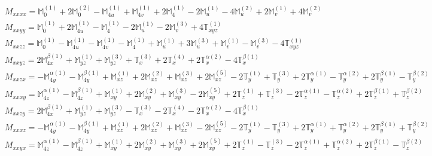 \documentclass[fleqn,8pt,landscape]{jsarticle}
\begin{document}
\begin{align*}
& M_{xxxx} = \mathbb{M}_{0}^{(1)} + 2 \mathbb{M}_{0}^{(2)} - \mathbb{M}_{4u}^{(1)} + \mathbb{M}_{4v}^{(1)} + 2 \mathbb{M}_{4}^{(1)} - 2 \mathbb{M}_{u}^{(1)} - 4 \mathbb{M}_{u}^{(2)} + 2 \mathbb{M}_{v}^{(1)} + 4 \mathbb{M}_{v}^{(2)} \\
& M_{xxyy} = \mathbb{M}_{0}^{(1)} + 2 \mathbb{M}_{4u}^{(1)} - \mathbb{M}_{4}^{(1)} - 2 \mathbb{M}_{u}^{(1)} - 2 \mathbb{M}_{v}^{(3)} + 4 \mathbb{T}_{xyz}^{(1)} \\
& M_{xxzz} = \mathbb{M}_{0}^{(1)} - \mathbb{M}_{4u}^{(1)} - \mathbb{M}_{4v}^{(1)} - \mathbb{M}_{4}^{(1)} + \mathbb{M}_{u}^{(1)} + 3 \mathbb{M}_{u}^{(3)} + \mathbb{M}_{v}^{(1)} - \mathbb{M}_{v}^{(3)} - 4 \mathbb{T}_{xyz}^{(1)} \\
& M_{xxyz} = 2 \mathbb{M}_{4x}^{\beta(1)} + \mathbb{M}_{yz}^{(1)} + \mathbb{M}_{yz}^{(3)} + \mathbb{T}_{x}^{(3)} + 2 \mathbb{T}_{x}^{(4)} + 2 \mathbb{T}_{x}^{\alpha(2)} - 4 \mathbb{T}_{x}^{\beta(1)} \\
& M_{xxzx} = - \mathbb{M}_{4y}^{\alpha(1)} - \mathbb{M}_{4y}^{\beta(1)} + \mathbb{M}_{xz}^{(1)} + 2 \mathbb{M}_{xz}^{(2)} + \mathbb{M}_{xz}^{(3)} + 2 \mathbb{M}_{xz}^{(5)} - 2 \mathbb{T}_{y}^{(1)} + \mathbb{T}_{y}^{(3)} + 2 \mathbb{T}_{y}^{\alpha(1)} - \mathbb{T}_{y}^{\alpha(2)} + 2 \mathbb{T}_{y}^{\beta(1)} - \mathbb{T}_{y}^{\beta(2)} \\
& M_{xxxy} = \mathbb{M}_{4z}^{\alpha(1)} - \mathbb{M}_{4z}^{\beta(1)} + \mathbb{M}_{xy}^{(1)} + 2 \mathbb{M}_{xy}^{(2)} + \mathbb{M}_{xy}^{(3)} - 2 \mathbb{M}_{xy}^{(5)} + 2 \mathbb{T}_{z}^{(1)} + \mathbb{T}_{z}^{(3)} - 2 \mathbb{T}_{z}^{\alpha(1)} - \mathbb{T}_{z}^{\alpha(2)} + 2 \mathbb{T}_{z}^{\beta(1)} + \mathbb{T}_{z}^{\beta(2)} \\
& M_{xxzy} = 2 \mathbb{M}_{4x}^{\beta(1)} + \mathbb{M}_{yz}^{(1)} + \mathbb{M}_{yz}^{(3)} - \mathbb{T}_{x}^{(3)} - 2 \mathbb{T}_{x}^{(4)} - 2 \mathbb{T}_{x}^{\alpha(2)} - 4 \mathbb{T}_{x}^{\beta(1)} \\
& M_{xxxz} = - \mathbb{M}_{4y}^{\alpha(1)} - \mathbb{M}_{4y}^{\beta(1)} + \mathbb{M}_{xz}^{(1)} + 2 \mathbb{M}_{xz}^{(2)} + \mathbb{M}_{xz}^{(3)} - 2 \mathbb{M}_{xz}^{(5)} - 2 \mathbb{T}_{y}^{(1)} - \mathbb{T}_{y}^{(3)} + 2 \mathbb{T}_{y}^{\alpha(1)} + \mathbb{T}_{y}^{\alpha(2)} + 2 \mathbb{T}_{y}^{\beta(1)} + \mathbb{T}_{y}^{\beta(2)} \\
& M_{xxyx} = \mathbb{M}_{4z}^{\alpha(1)} - \mathbb{M}_{4z}^{\beta(1)} + \mathbb{M}_{xy}^{(1)} + 2 \mathbb{M}_{xy}^{(2)} + \mathbb{M}_{xy}^{(3)} + 2 \mathbb{M}_{xy}^{(5)} + 2 \mathbb{T}_{z}^{(1)} - \mathbb{T}_{z}^{(3)} - 2 \mathbb{T}_{z}^{\alpha(1)} + \mathbb{T}_{z}^{\alpha(2)} + 2 \mathbb{T}_{z}^{\beta(1)} - \mathbb{T}_{z}^{\beta(2)} \\

\end{align*}
\end{document}
